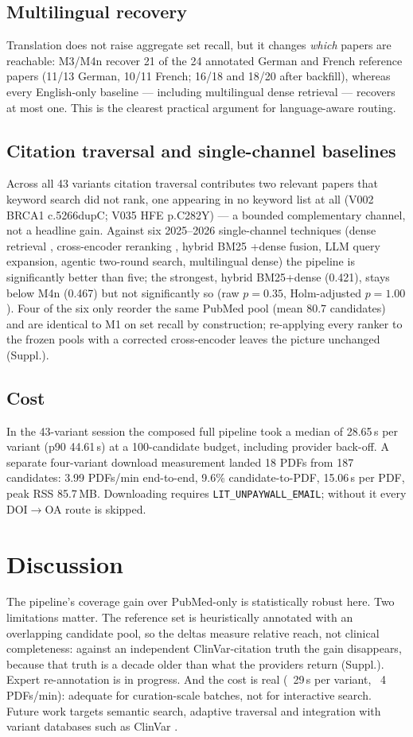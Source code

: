 \documentclass[10pt,twocolumn,letterpaper]{article}
\begin{document}
\subsection*{Multilingual recovery}
Translation does not raise aggregate set recall, but it changes \emph{which}
papers are reachable: M3/M4n recover 21 of the 24 annotated German and French
reference papers (11/13 German, 10/11 French; 16/18 and 18/20 after backfill),
whereas every English-only
baseline --- including multilingual dense retrieval --- recovers at most one.
This is the clearest practical argument for language-aware routing.

\subsection*{Citation traversal and single-channel baselines}
Across all 43 variants citation traversal contributes two relevant papers that
keyword search did not rank, one appearing in no keyword list at all (V002
BRCA1 c.5266dupC; V035 HFE p.C282Y) --- a bounded complementary channel, not a
headline gain. Against six 2025--2026 single-channel techniques (dense
retrieval \cite{karpukhin2020}, cross-encoder reranking \cite{nogueira2019},
hybrid BM25 \cite{robertson2009}+dense fusion, LLM query
expansion, agentic two-round search, multilingual dense) the pipeline is
significantly better than five; the strongest, hybrid BM25+dense (0.421), stays
below M4n (0.467) but not significantly so
(raw $p=0.35$, Holm-adjusted $p=1.00$). Four of the six only reorder the same PubMed pool
(mean 80.7 candidates) and are identical to M1 on set recall by construction;
re-applying every ranker to the frozen pools with a corrected cross-encoder leaves
the picture unchanged (Suppl.).

\subsection*{Cost}
In the 43-variant session the composed full pipeline took a median of 28.65\,s
per variant (p90 44.61\,s) at a 100-candidate budget, including provider
back-off. A separate four-variant download measurement landed 18 PDFs from 187
candidates: 3.99 PDFs/min end-to-end, 9.6\% candidate-to-PDF, 15.06\,s per PDF,
peak RSS 85.7\,MB. Downloading requires \texttt{LIT\_UNPAYWALL\_EMAIL};
without it every DOI$\rightarrow$OA route is skipped.

\section{Discussion}
The pipeline's coverage gain over PubMed-only is statistically robust here. Two
limitations matter. The reference set is heuristically annotated with an
overlapping candidate pool, so the deltas measure relative reach, not clinical
completeness: against an independent ClinVar-citation truth the gain disappears,
because that truth is a decade older than what the providers return (Suppl.).
Expert re-annotation is in progress. And the cost is real (~29\,s per variant,
~4 PDFs/min): adequate for curation-scale batches, not for interactive search.
Future work targets semantic search, adaptive traversal and integration with
variant databases such as ClinVar \cite{landrum2018}.
\end{document}
